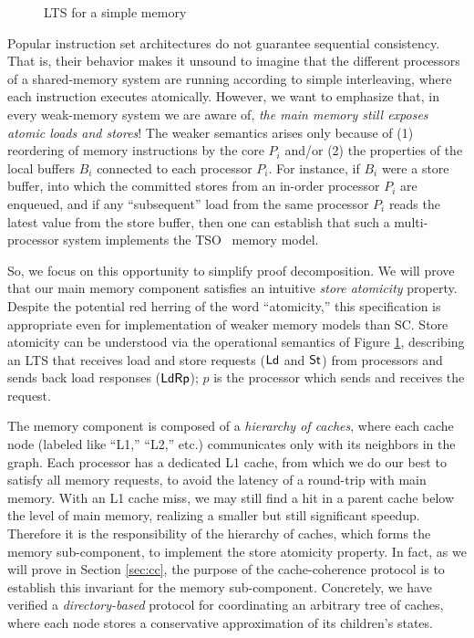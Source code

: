 \begin{figure}
\small
\centering
\begin{boxedminipage}[c]{.48\textwidth}
\inference
[Load]
{}
{}

\inference
[Store]
{}
{}

\end{boxedminipage}
\caption{LTS for a simple memory}
\label{M_m}
\end{figure}

Popular instruction set architectures do not guarantee sequential
consistency.  That is, their behavior makes it unsound to imagine that
the different processors of a shared-memory system are running
according to simple interleaving, where each instruction executes
atomically.  However, we want to emphasize that, in every weak-memory
system we are aware of, \emph{the main memory still exposes atomic
  loads and stores}!  The weaker semantics arises only because of (1)
reordering of memory instructions by the core $P_i$ and/or (2) the
properties of the local buffers $B_i$ connected to each processor
$P_i$.  For instance, if $B_i$ were a store buffer, into which the
committed stores from an in-order processor $P_i$ are enqueued, and if
any ``subsequent'' load from the same processor $P_i$ reads the latest
value from the store buffer, then one can establish that such a
multi-processor system implements the TSO~\cite{x86tsocacm10} memory
model.

So, we focus on this opportunity to simplify proof decomposition.  We
will prove that our main memory component satisfies an intuitive
\emph{store atomicity} property.  Despite the potential red herring of
the word ``atomicity,'' this specification is appropriate even for
implementation of weaker memory models than SC.  Store atomicity can
be understood via the operational semantics of Figure \ref{M_m},
describing an LTS that receives load and store requests ($\mathsf{Ld}$ and
$\mathsf{St}$) from processors and sends back load responses ($\mathsf{Ld}\mathsf{Rp}$);
$p$ is the processor which sends and receives the request.

The memory component is composed of a \emph{hierarchy of caches}, where each
cache node (labeled like ``L1,'' ``L2,'' etc.) communicates only with its
neighbors in the graph.  Each processor has a dedicated L1 cache, from which we
do our best to satisfy all memory requests, to avoid the latency of a
round-trip with main memory.  With an L1 cache miss, we may still find a hit in
a parent cache below the level of main memory, realizing a smaller but still
significant speedup.  Therefore it is the responsibility of the hierarchy of
caches, which forms the memory sub-component, to implement the store atomicity
property. In fact, as we will prove in Section \ref{sec:cc}, the purpose of the
cache-coherence protocol is to establish this invariant for the memory
sub-component.  Concretely, we have verified a \emph{directory-based} protocol
for coordinating an arbitrary tree of caches, where each node stores a
conservative approximation of its children's states.

